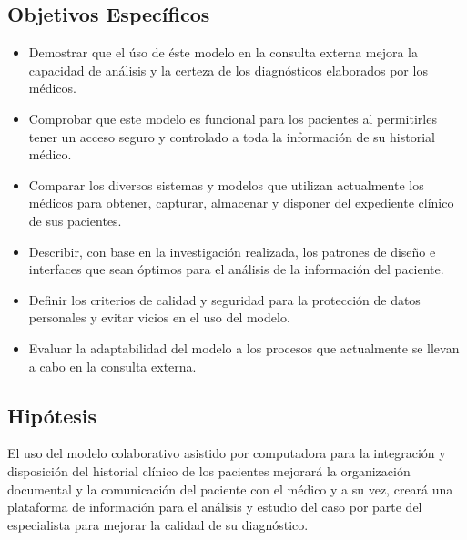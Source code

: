     \subsection{Objetivos Específicos}
    \begin{itemize}
        \item Demostrar que el úso de éste modelo en la consulta externa mejora la capacidad de análisis y la certeza de los diagnósticos elaborados por los médicos.
        
        \item Comprobar que este modelo es funcional para los pacientes al permitirles tener un acceso seguro y controlado a toda la información de su historial médico.
        
        \item Comparar los diversos sistemas y modelos que utilizan actualmente los médicos para obtener, capturar, almacenar y disponer del expediente clínico de sus pacientes.
        
        \item Describir, con base en la investigación realizada, los patrones de diseño e interfaces que sean óptimos para el análisis de la información del paciente.
        
        \item Definir los criterios de calidad y seguridad para la protección de datos personales y evitar vicios en el uso del modelo.
        
        \item Evaluar la adaptabilidad del modelo a los procesos que actualmente se llevan a cabo en la consulta externa.
    \end{itemize}




    \subsection{Hipótesis}

    El uso del modelo colaborativo asistido por computadora para la integración y disposición del historial clínico de los pacientes mejorará la organización documental y la comunicación del paciente con el médico y a su vez, creará una plataforma de información para el análisis y estudio del caso por parte del especialista para mejorar la calidad de su diagnóstico.